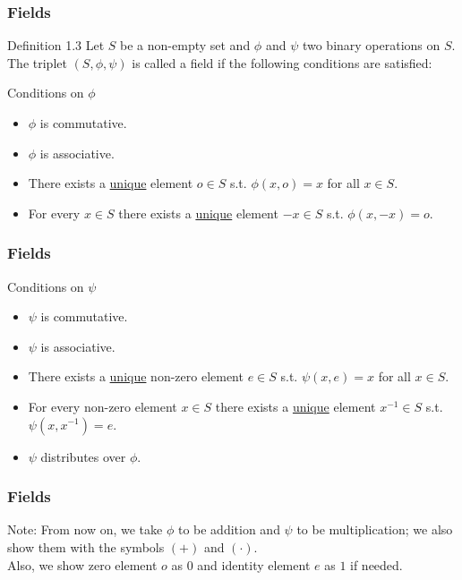 \documentclass{beamer}
\begin{document}
\begin{frame}
    \frametitle{Fields}

\begin{block}{Definition 1.3}
    Let $S$ be a non-empty set and $\phi$ and $\psi$ two binary operations on $S$. The triplet $(S, \phi, \psi)$ is called a field if the following
    conditions are satisfied:
\end{block}

\begin{block}{Conditions on $\phi$}
    \begin{itemize}
        \item <3-> $\phi$ is commutative.
        \item <4-> $\phi$ is associative.
        \item <5-> There exists a \underline{unique} element $o \in S$ s.t. $\phi(x,o) = x$ for all $x \in S$.
        \item <6-> For every $x \in S$ there exists a \underline{unique} element $-x \in S$ s.t. $\phi(x,-x) = o$.
    \end{itemize}
\end{block}
\end{frame}

\begin{frame}
    \frametitle{Fields}
\begin{block}{Conditions on $\psi$}
    \begin{itemize}
        \item $\psi$ is commutative.
        \item <2->$\psi$ is associative.
        \item <3->There exists a \underline{unique} non-zero element $e \in S$ s.t. $\psi(x,e) = x$ for all $x \in S$.
        \item <4->For every non-zero element $x \in S$ there exists a \underline{unique} element $x^{-1} \in S$ s.t. $\psi(x,x^{-1}) = e$.
        \item <5->$\psi$ distributes over $\phi$.
    \end{itemize}
\end{block}
\end{frame}

\begin{frame}
    \frametitle{Fields}
Note: From now on, we take $\phi$ to be addition and $\psi$ to be multiplication; we also show them with the symbols $(+)$ and $(\cdot)$.\\
Also, we show zero element $o$ as $0$ and identity element $e$ as $1$ if needed.
\end{frame}
\end{document}
